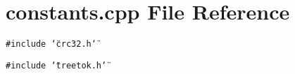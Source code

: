 \section{constants.cpp File Reference}
\label{constants_8cpp}
{\tt \#include \char`\"{}crc32.h\char`\"{}}\par
{\tt \#include \char`\"{}treetok.h\char`\"{}}\par
